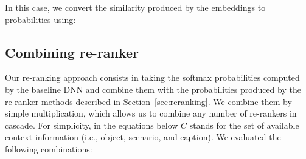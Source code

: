 \documentclass[phd,tocprelim]{cornell}
\begin{document}
In this case, we convert the similarity produced by the embeddings to probabilities using:


















\subsection{Combining re-ranker}

Our re-ranking approach consists in taking the softmax probabilities computed by the baseline DNN and combine them with the probabilities produced by the re-ranker methods described in Section~\ref{sec:reranking}. We combine them by simple multiplication, which allows us to combine any number of re-rankers in cascade. 
For simplicity, in the equations below $C$ stands for the set of available context information (i.e., object, scenario, and caption). We evaluated the following combinations:
\end{document}
